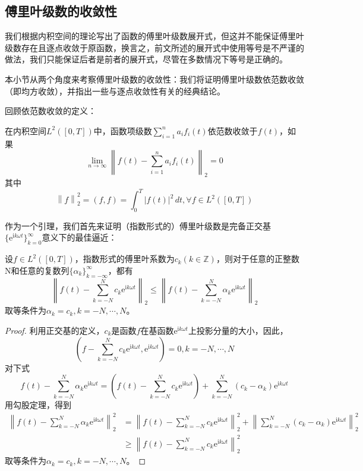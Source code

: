 \documentclass{ctexbook}
\begin{document}
\subsection{傅里叶级数的收敛性}\label{sub:fourier_series_convergency}

我们根据内积空间的理论写出了函数的傅里叶级数展开式，但这并不能保证傅里叶级数存在且逐点收敛于原函数，换言之，前文所述的展开式中使用等号是不严谨的做法，我们只能保证后者是前者的展开式，尽管在多数情况下等号是正确的。

本小节从两个角度来考察傅里叶级数的收敛性：我们将证明傅里叶级数依范数收敛（即均方收敛），并指出一些与逐点收敛性有关的经典结论。

回顾依范数收敛的定义：
\begin{definition}
    在内积空间$L^2([0,T])$中，函数项级数$\sum_{i = 1}^{n}  a_i f_i(t)$依范数收敛于$f(t)$，如果
    \[\lim_{n \to \infty} \left\| f(t)-\sum_{i = 1}^{n}  a_i f_i(t)\right\|_2=0\]
    其中
    \[\left\|f\right\|_2^2=(f,f)=\int_{0}^{T}|f(t)|^2\,dt,\forall f\in L^2([0,T])\]
\end{definition}

作为一个引理，我们首先来证明（指数形式的）傅里叶级数是完备正交基$\{\mathrm{e}^{\mathrm{i}k\omega t}\}_{k=0}^{\infty}$意义下的最佳逼近：
\begin{lemma}
    设$f\in L^2([0,T])$，指数形式的傅里叶系数为$c_k(k\in\mathbb{Z} )$，则对于任意的正整数N和任意的复数列$\{\alpha_k\}_{k=-\infty}^{\infty}$，都有
    \[\left\|f(t)-\sum_{k=-N}^{N}c_k \mathrm{e}^{\mathrm{i}k\omega t}\right\|_2\leq\left\|f(t)-\sum_{k=-N}^{N}\alpha_k \mathrm{e}^{\mathrm{i}k\omega t}\right\|_2\]
    取等条件为$\alpha_k=c_k,k=-N,\cdots,N$。
\end{lemma}
\begin{proof}
    利用正交基的定义，$c_k$是函数$f$在基函数$\mathrm{e}^{\mathrm{i}k\omega t}$上投影分量的大小，因此，
    \[\left(f-\sum_{k=-N}^{N}c_k \mathrm{e}^{\mathrm{i}k\omega t},\mathrm{e}^{\mathrm{i}k\omega t}\right)=0,k=-N,\cdots,N\]
    对下式
    \[f(t)-\sum_{k=-N}^{N}\alpha_k \mathrm{e}^{\mathrm{i}k\omega t}=\left(f(t)-\sum_{k=-N}^{N}c_k \mathrm{e}^{\mathrm{i}k\omega t}\right)+\sum_{k=-N}^{N}(c_k-\alpha_k) \mathrm{e}^{\mathrm{i}k\omega t}\]
    用勾股定理，得到
    \begin{align*}
        \left\|f(t)-\sum_{k=-N}^{N}\alpha_k \mathrm{e}^{\mathrm{i}k\omega t}\right\|_2^2&=\left\|f(t)-\sum_{k=-N}^{N}c_k \mathrm{e}^{\mathrm{i}k\omega t}\right\|_2^2+\left\|\sum_{k=-N}^{N}(c_k-\alpha_k) \mathrm{e}^{\mathrm{i}k\omega t}\right\|_2^2\\
        &\geq \left\|f(t)-\sum_{k=-N}^{N}c_k \mathrm{e}^{\mathrm{i}k\omega t}\right\|_2^2
    \end{align*}
    取等条件为$\alpha_k=c_k,k=-N,\cdots,N$。
\end{proof}
\end{document}
